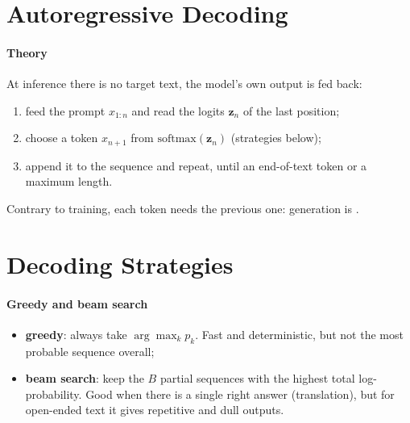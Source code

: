 \section{Autoregressive Decoding}
\paragraph{Theory}
At inference there is no target text, the model's own output is fed back:
\begin{enumerate}
    \item feed the prompt $x_{1:n}$ and read the logits $\bm{z}_{n}$ of the last
        position;
    \item choose a token $x_{n+1}$ from $\mathrm{softmax}(\bm{z}_{n})$ (strategies below);
    \item append it to the sequence and repeat, until an end-of-text token or a maximum
        length.
\end{enumerate}
Contrary to training, each token needs the previous one: generation is .

\section{Decoding Strategies}
\paragraph{Greedy and beam search}
\begin{itemize}
    \item \textbf{greedy}: always take $\arg\max_{k}p_{k}$. Fast and deterministic, but not
        the most probable sequence overall;
    \item \textbf{beam search}: keep the $B$ partial sequences with the highest total
        log-probability. Good when there is a single right answer (translation), but for
        open-ended text it gives repetitive and dull outputs.
\end{itemize}

